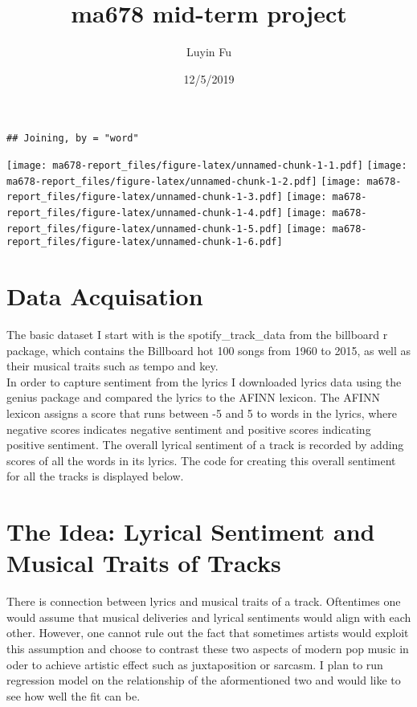 \documentclass[]{article}
\title{ma678 mid-term project}
\author{Luyin Fu}
\date{12/5/2019}
\begin{document}
\maketitle

\begin{verbatim}
## Joining, by = "word"
\end{verbatim}

\texttt{[image: ma678-report\_files/figure-latex/unnamed-chunk-1-1.pdf]}
\texttt{[image: ma678-report\_files/figure-latex/unnamed-chunk-1-2.pdf]}
\texttt{[image: ma678-report\_files/figure-latex/unnamed-chunk-1-3.pdf]}
\texttt{[image: ma678-report\_files/figure-latex/unnamed-chunk-1-4.pdf]}
\texttt{[image: ma678-report\_files/figure-latex/unnamed-chunk-1-5.pdf]}
\texttt{[image: ma678-report\_files/figure-latex/unnamed-chunk-1-6.pdf]}

\hypertarget{data-acquisation}{%
\section{Data Acquisation}\label{data-acquisation}}

The basic dataset I start with is the spotify\_track\_data from the
billboard r package, which contains the Billboard hot 100 songs from
1960 to 2015, as well as their musical traits such as tempo and key.\\
In order to capture sentiment from the lyrics I downloaded lyrics data
using the genius package and compared the lyrics to the AFINN lexicon.
The AFINN lexicon assigns a score that runs between -5 and 5 to words in
the lyrics, where negative scores indicates negative sentiment and
positive scores indicating positive sentiment. The overall lyrical
sentiment of a track is recorded by adding scores of all the words in
its lyrics. The code for creating this overall sentiment for all the
tracks is displayed below.

\hypertarget{the-idea-lyrical-sentiment-and-musical-traits-of-tracks}{%
\section{The Idea: Lyrical Sentiment and Musical Traits of
Tracks}\label{the-idea-lyrical-sentiment-and-musical-traits-of-tracks}}

There is connection between lyrics and musical traits of a track.
Oftentimes one would assume that musical deliveries and lyrical
sentiments would align with each other. However, one cannot rule out the
fact that sometimes artists would exploit this assumption and choose to
contrast these two aspects of modern pop music in oder to achieve
artistic effect such as juxtaposition or sarcasm. I plan to run
regression model on the relationship of the aformentioned two and would
like to see how well the fit can be.
\end{document}
